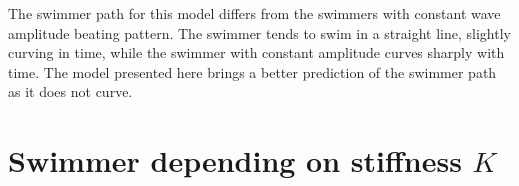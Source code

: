 The swimmer path for this model differs from the swimmers with constant wave amplitude beating pattern. The swimmer tends to swim in a straight line, slightly curving in time, while
the swimmer with constant amplitude curves sharply with time. The model presented here brings a better prediction of the swimmer path as it does not curve.


\section{Swimmer depending on stiffness $K$}
\label{sec:section 5}


\begin{figure}[H]
\centering
  \begin{footnotesize}
  
  \caption[]{}
   \label{fig:Bild4.17}
  \end{footnotesize}
\end{figure}


\begin{figure}[H]
\centering
  \begin{footnotesize}
  
  \caption[]{}
   \label{fig:Bild4.18}
  \end{footnotesize}
\end{figure}

\begin{figure}[H]
\centering
  \begin{footnotesize}
  
  \caption[]{}
   \label{fig:Bild4.19}
  \end{footnotesize}
\end{figure}
